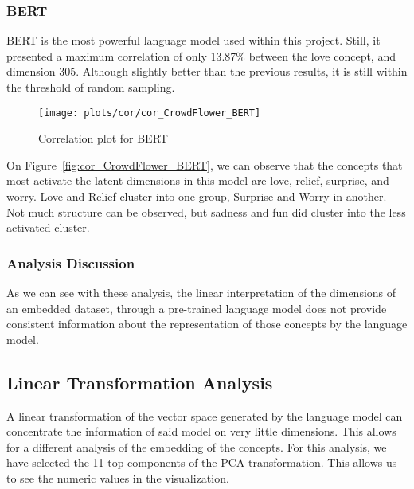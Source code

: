 \subsubsection{BERT}
BERT is the most powerful language model used within this project. Still, it presented a maximum correlation of only 13.87\% between the love concept, and dimension 305. Although slightly better than the previous results, it is still within the threshold of random sampling.
\begin{figure}[H]
  \texttt{[image: plots/cor/cor\_CrowdFlower\_BERT]}
  \centering
  \caption{Correlation plot for BERT}
\end{figure}\label{fig:cor_CrowdFlower_BERT}
On Figure~\ref{fig:cor_CrowdFlower_BERT}, we can observe that the concepts that most activate the latent dimensions in this model are love, relief, surprise, and worry. Love and Relief cluster into one group, Surprise and Worry in another. Not much structure can be observed, but sadness and fun did cluster into the less activated cluster.

\subsubsection{Analysis Discussion}
As we can see with these analysis, the linear interpretation of the dimensions of an embedded dataset, through a pre-trained language model does not provide consistent information about the representation of those concepts by the language model.


\subsection{Linear Transformation Analysis}\label{sub:Linear Transformation Analysis}
A linear transformation of the vector space generated by the language model can concentrate the information of said model on very little dimensions. This allows for a different analysis of the embedding of the concepts. For this analysis, we have selected the 11 top components of the PCA transformation. This allows us to see the numeric values in the visualization.

